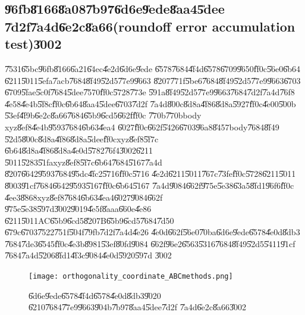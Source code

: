 \subsection{\U{96fb}\U{8166}\U{8a08}\U{7b97}\U{6d6e}\U{9ede}\U{8aa4}\U{5dee}%
\U{7d2f}\U{7a4d}\U{6e2c}\U{8a66}(roundoff error accumulation test)\U{3002}}

\U{7531}\U{65bc}\U{96fb}\U{8166}\U{6a21}\U{64ec}\U{4e2d}\U{6d6e}\U{9ede}%
\U{6578}\U{7684}\U{4f4d}\U{6578}\U{6709}\U{9650}\U{ff0c}\U{56e0}\U{6b64}%
\U{6211}\U{5011}\U{5efa}\U{7acb}\U{7684}\U{8f49}\U{52d5}\U{77e9}\U{9663}%
\U{8207}\U{771f}\U{5be6}\U{7684}\U{8f49}\U{52d5}\U{77e9}\U{9663}\U{6703}%
\U{6709}\U{5fae}\U{5c0f}\U{7684}\U{5dee}\U{7570}\U{ff0c}\U{5728}\U{773e}%
\U{591a}\U{8f49}\U{52d5}\U{77e9}\U{9663}\U{7684}\U{7d2f}\U{7a4d}\U{76f8}%
\U{4e58}\U{4e4b}\U{5f8c}\U{ff0c}\U{6b64}\U{8aa4}\U{5dee}\U{6703}\U{7d2f}%
\U{7a4d}\U{800c}\U{8d8a}\U{4f86}\U{8d8a}\U{5927}\U{ff0c}\U{4e00}\U{500b}%
\U{53ef}\U{4f9b}\U{6e2c}\U{8a66}\U{7684}\U{65b9}\U{6cd5}\U{662f}\U{ff0c}%
\U{770b}\U{770b}body xyz\U{8ef8}\U{4e4b}\U{9593}\U{7684}\U{6b63}\U{4ea4}%
\U{6027}\U{ff0c}\U{662f}\U{5426}\U{6703}\U{96a8}\U{8457}body\U{7684}\U{8f49}%
\U{52d5}\U{800c}\U{8d8a}\U{4f86}\U{8d8a}\U{5dee}\U{ff0c}xyz\U{8ef8}\U{5f7c}%
\U{6b64}\U{8d8a}\U{4f86}\U{8d8a}\U{4e0d}\U{5782}\U{76f4}\U{3002}\U{6211}%
\U{5011}\U{5283}\U{51fa}xyz\U{8ef8}\U{5f7c}\U{6b64}\U{7684}\U{5167}\U{7a4d}%
\U{8207}\U{6642}\U{9593}\U{7684}\U{95dc}\U{4fc2}\U{5716}\U{ff0c}\U{5716}%
\U{4e2d}\U{6211}\U{5011}\U{767c}\U{73fe}\U{ff0c}\U{5728}\U{6211}\U{5011}%
\U{8003}\U{91cf}\U{7684}\U{6642}\U{9593}\U{5167}\U{ff0c}\U{6b64}\U{5167}%
\U{7a4d}\U{9084}\U{662f}\U{975e}\U{5e38}\U{63a5}\U{8fd1}\U{96f6}\U{ff0c}%
\U{4ee3}\U{8868}xyz\U{8ef8}\U{7684}\U{6b63}\U{4ea4}\U{6027}\U{9084}\U{662f}%
\U{975e}\U{5e38}\U{597d}\U{3002}\U{9019}\U{4e5f}\U{8aaa}\U{660e}\U{4e86}%
\U{6211}\U{5011}AC\U{65b9}\U{6cd5}\U{8207}B\U{65b9}\U{6cd5}\U{7684}\U{7d50}%
\U{679c}\U{6703}\U{7522}\U{751f}\U{504f}\U{79fb}\U{7d2f}\U{7a4d}\U{4e26}%
\U{4e0d}\U{662f}\U{56e0}\U{70ba}\U{6d6e}\U{9ede}\U{6578}\U{4e0d}\U{8db3}%
\U{7684}\U{7de3}\U{6545}\U{ff0c}\U{4e3b}\U{8981}\U{53ef}\U{80fd}\U{9084}%
\U{662f}\U{96e2}\U{6563}\U{5316}\U{7684}\U{8f49}\U{52d5}\U{5411}\U{91cf}%
\U{7684}\U{7a4d}\U{5206}\U{8fd1}\U{4f3c}\U{9084}\U{4e0d}\U{5920}\U{597d}%
\U{3002}

\begin{figure}[th]
\caption{\U{6d6e}\U{9ede}\U{6578}\U{4f4d}\U{6578}\U{4e0d}\U{8db3}\U{9020}%
\U{6210}\U{7684}\U{77e9}\U{9663}\U{904b}\U{7b97}\U{8aa4}\U{5dee}\U{7d2f}%
\U{7a4d}\U{6e2c}\U{8a66}\U{3002}}
\begin{center}
\texttt{[image: orthogonality\_coordinate\_ABCmethods.png]}
\end{center}
\end{figure}

